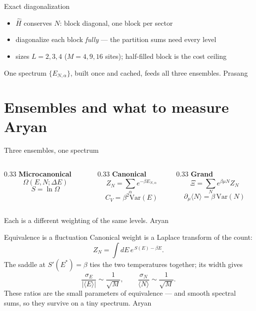 \documentclass[10pt,aspectratio=169]{beamer}
\newcommand{\avg}[1]{\langle #1 \rangle}
\newcommand{\speaker}[1]{\hfill{\scriptsize\color{gray}#1}}
\begin{document}
\begin{frame}{Exact diagonalization}
  \begin{itemize}
    \item $\hat H$ conserves $N$: block diagonal, one block per sector
    \item diagonalize each block \emph{fully} --- the partition sums need every level
    \item sizes $L=2,3,4$ ($M=4,9,16$ sites); half-filled block is the cost ceiling
  \end{itemize}
  \vspace{0.5em}
  One spectrum $\{E_{N,\alpha}\}$, built once and cached, feeds all three ensembles.
  \speaker{Prasang}
\end{frame}

\section{Ensembles and what to measure \hfill\normalfont\scriptsize Aryan}

\begin{frame}{Three ensembles, one spectrum}
  \begin{columns}[T]
    \begin{column}{0.33\textwidth}
      \textbf{Microcanonical}
      \[ \Omega(E,N;\Delta E) \]
      \[ S=\ln\Omega \]
    \end{column}
    \begin{column}{0.33\textwidth}
      \textbf{Canonical}
      \[ Z_N=\sum_\alpha e^{-\beta E_{N,\alpha}} \]
      \[ C_V=\beta^2\mathrm{Var}(E) \]
    \end{column}
    \begin{column}{0.33\textwidth}
      \textbf{Grand}
      \[ \Xi=\sum_N e^{\beta\mu N}Z_N \]
      \[ \partial_\mu\avg N=\beta\,\mathrm{Var}(N) \]
    \end{column}
  \end{columns}
  \vspace{0.6em}
  Each is a different weighting of the same levels.
  \speaker{Aryan}
\end{frame}

\begin{frame}{Equivalence is a fluctuation}
  Canonical weight is a Laplace transform of the count:
  \[ Z_N=\int dE\, e^{\,S(E)-\beta E}. \]
  The saddle at $S'(E^\ast)=\beta$ ties the two temperatures together; its width gives
  \[ \frac{\sigma_E}{|\avg E|}\sim\frac{1}{\sqrt M},
     \qquad \frac{\sigma_N}{\avg N}\sim\frac{1}{\sqrt M}. \]
  These ratios are the small parameters of equivalence --- and smooth spectral sums,
  so they survive on a tiny spectrum.
  \speaker{Aryan}
\end{frame}
\end{document}
